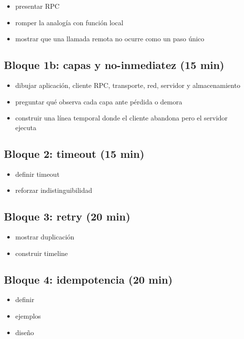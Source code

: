 \documentclass[variant=docente,cover=institutional,mode=screen]{ua-engineering-v6-article}
\begin{document}
\begin{itemize}
\item presentar RPC
\item romper la analogía con función local
\item mostrar que una llamada remota no ocurre como un paso único
\end{itemize}

\subsection*{Bloque 1b: capas y no-inmediatez (15 min)}

\begin{itemize}
\item dibujar aplicación, cliente RPC, transporte, red, servidor y almacenamiento
\item preguntar qué observa cada capa ante pérdida o demora
\item construir una línea temporal donde el cliente abandona pero el servidor ejecuta
\end{itemize}

\subsection*{Bloque 2: timeout (15 min)}

\begin{itemize}
\item definir timeout
\item reforzar indistinguibilidad
\end{itemize}

\subsection*{Bloque 3: retry (20 min)}

\begin{itemize}
\item mostrar duplicación
\item construir timeline
\end{itemize}

\subsection*{Bloque 4: idempotencia (20 min)}

\begin{itemize}
\item definir
\item ejemplos
\item diseño
\end{itemize}
\end{document}
